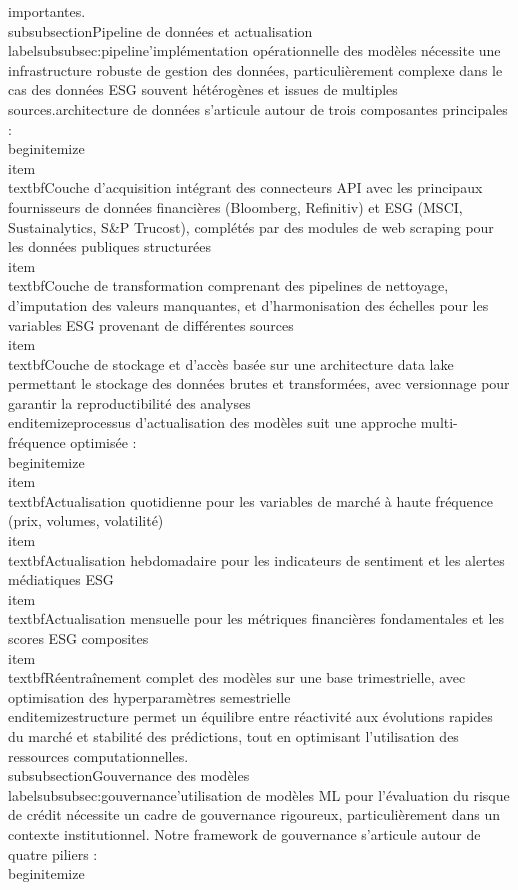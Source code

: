 importantes.\n\n\\subsubsection{Pipeline de données et actualisation}\\label{subsubsec:pipeline}\n\nL'implémentation opérationnelle des modèles nécessite une infrastructure robuste de gestion des données, particulièrement complexe dans le cas des données ESG souvent hétérogènes et issues de multiples sources.\n\nNotre architecture de données s'articule autour de trois composantes principales :\n\n\\begin{itemize}\n    \\item \\textbf{Couche d'acquisition} intégrant des connecteurs API avec les principaux fournisseurs de données financières (Bloomberg, Refinitiv) et ESG (MSCI, Sustainalytics, S&P Trucost), complétés par des modules de web scraping pour les données publiques structurées\n    \n    \\item \\textbf{Couche de transformation} comprenant des pipelines de nettoyage, d'imputation des valeurs manquantes, et d'harmonisation des échelles pour les variables ESG provenant de différentes sources\n    \n    \\item \\textbf{Couche de stockage et d'accès} basée sur une architecture data lake permettant le stockage des données brutes et transformées, avec versionnage pour garantir la reproductibilité des analyses\n\\end{itemize}\n\nLe processus d'actualisation des modèles suit une approche multi-fréquence optimisée :\n\n\\begin{itemize}\n    \\item \\textbf{Actualisation quotidienne} pour les variables de marché à haute fréquence (prix, volumes, volatilité)\n    \n    \\item \\textbf{Actualisation hebdomadaire} pour les indicateurs de sentiment et les alertes médiatiques ESG\n    \n    \\item \\textbf{Actualisation mensuelle} pour les métriques financières fondamentales et les scores ESG composites\n    \n    \\item \\textbf{Réentraînement complet} des modèles sur une base trimestrielle, avec optimisation des hyperparamètres semestrielle\n\\end{itemize}\n\nCette structure permet un équilibre entre réactivité aux évolutions rapides du marché et stabilité des prédictions, tout en optimisant l'utilisation des ressources computationnelles.\n\n\\subsubsection{Gouvernance des modèles}\\label{subsubsec:gouvernance}\n\nL'utilisation de modèles ML pour l'évaluation du risque de crédit nécessite un cadre de gouvernance rigoureux, particulièrement dans un contexte institutionnel. Notre framework de gouvernance s'articule autour de quatre piliers :\n\n\\begin{itemize}\n    